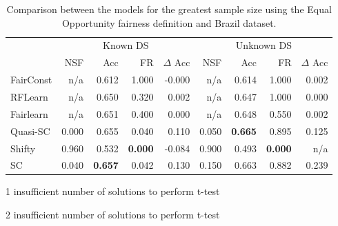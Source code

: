 \begin{table}[H]
\begin{threeparttable}
\centering
\begin{tabular}{lrrrrrrrr}
\toprule
 & \multicolumn{4}{c}{Known DS} & \multicolumn{4}{c}{Unknown DS} \\
 & NSF & Acc & FR & $\Delta$ Acc & NSF & Acc & FR & $\Delta$ Acc \\
\cmidrule(r){2-5} \cmidrule{6-9}
FairConst & n/a & 0.612 & 1.000 & -0.000 & n/a & 0.614 & 1.000 & 0.002 \\
RFLearn & n/a & 0.650 & 0.320 & 0.002 & n/a & 0.647 & 1.000 & 0.000 \\
Fairlearn & n/a & 0.651 & 0.400 & 0.000 & n/a & 0.648 & 0.550 & 0.002 \\
Quasi-SC & 0.000 & 0.655 & 0.040 & 0.110 & 0.050 & \bfseries 0.665 & 0.895 & 0.125 \\
Shifty & 0.960 & 0.532\tnote{1} & \bfseries 0.000 & -0.084 & 0.900 & 0.493\tnote{2} & \bfseries 0.000 & n/a \\
SC & 0.040 & \bfseries 0.657 & 0.042 & 0.130 & 0.150 & 0.663 & 0.882 & 0.239 \\
\bottomrule
\end{tabular}
\begin{tablenotes}
\item[1] insufficient number of solutions to perform t-test
\item[2] insufficient number of solutions to perform t-test
\end{tablenotes}
\end{threeparttable}
\caption{Comparison between the models for the greatest sample size using the Equal Opportunity fairness definition and Brazil dataset.}
\label{eopp_brazil}
\end{table}


